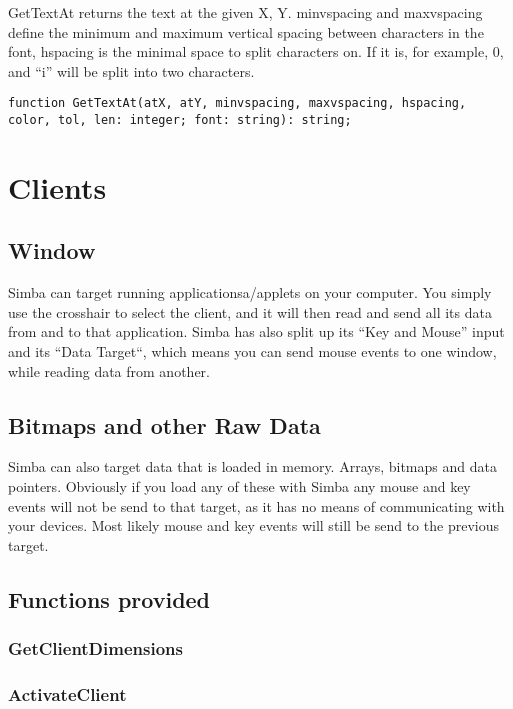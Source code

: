 \documentclass[a4paper]{report}
\begin{document}
GetTextAt returns the text at the given X, Y.
minvspacing and maxvspacing define the minimum and maximum vertical spacing
between characters in the font, hspacing is the minimal space to split
characters on. If it is, for example, 0, and ``i'' will be split into two
characters.

\begin{verbatim}
function GetTextAt(atX, atY, minvspacing, maxvspacing, hspacing, color, tol, len: integer; font: string): string;  
\end{verbatim}

\chapter{Clients}

\section{Window}
Simba can target running applicationsa/applets on your computer. 
You simply use the crosshair to select the client, and it will then read and
send all its data from and to that application. Simba has also split up its
``Key and Mouse'' input and its ``Data Target``, which means you can send
mouse events to one window, while reading data from another.

\section{Bitmaps and other Raw Data}

Simba can also target data that is loaded in memory. Arrays, bitmaps and data
pointers. Obviously if you load any of these with Simba any mouse and key
events will not be send to that target, as it has no means of communicating
with your devices. Most likely mouse and key events will still be send to the
previous target.

\section{Functions provided}

\subsection{GetClientDimensions}

\subsection{ActivateClient}
\end{document}

